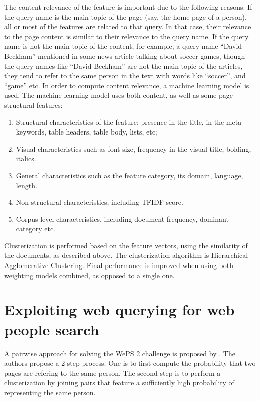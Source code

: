 The content relevance of the feature is important due to the following reasons:
If the query name is the main topic of the page (say, the home page of a person),
all or most of the features are related to that query. In that case, their relevance
to the page content is similar to their relevance to the query name. 
If the query name is not the main topic of the content, for example, a query name
“David Beckham” mentioned in some news article talking about soccer games, though
the query names like “David Beckham” are not the main topic of the articles, they
tend to refer to the same person in the text with words like “soccer”, and “game” etc.
In order to compute content relevance, a machine learning model is used. The machine
learning model uses both content, as well as some page structural features:
\begin {enumerate}
\item Structural characteristics of the feature: presence in the title, in the meta keywords,
table headers, table body, lists, etc;
\item Visual characteristics such as font size, frequency in the visual title, bolding, italics.
\item General characteristics such as the feature category, its domain, language, length.
\item Non-structural characteristics, including TFIDF score.
\item Corpus level characteristics, including document frequency, dominant category etc.
\end {enumerate}

Clusterization is performed based on the feature vectors, using the similarity of the
documents, as described above. The clusterization algorithm is Hierarchical Agglomerative
Clustering. Final performance is improved when using both weighting models combined,
as opposed to a single one.

\section{Exploiting web querying for web people search}
A pairwise approach for solving the WePS 2 challenge is proposed by \cite{nuray2009exploiting}.
The authors propose a 2 step process. One is to first compute the probability
that two pages are refering to the same person. The second step is to perform
a clusterization by joining pairs that feature a sufficiently high probability
of representing the same person.

